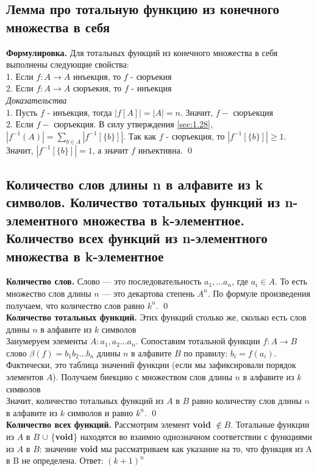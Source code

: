 \documentclass[a4paper]{article}
\begin{document}
\subsection{Лемма про тотальную функцию из конечного множества в себя}
\textbf{Формулировка.} Для тотальных функций из конечного множества в себя выполнены следующие свойства:\\[2mm]
 1. Если $f: A\rightarrow A$ инъекция, то $f$ - сюръекия\\[2mm]
 2. Если $f: A\rightarrow A$ сюръекия, то $f$ - инъекция\\[2mm]
\textit{Доказательства}\\[2mm]
 1. Пусть $f$ - инъекция, тогда $|f[A]|=|A|=n$. Значит, $f-$ сюръекция\\[2mm]
 2. Если $f-$ сюръекция. В силу утверждения \ref{sec:1.28}, $|f^{-1}(A)|=\sum\limits_{b\in A} |f^{-1}[\{b\}]|.$ Так как $f$ - сюръекция, то $|f^{-1}[\{b\}]|\geqslant1$. Значит, $|f^{-1}[\{b\}]|=1$, а значит $f$ инъективна. \qed
\subsection{Количество слов длины n в алфавите из k символов. Количество тотальных функций из n-элементного множества в k-элементное. Количество всех функций из n-элементного множества в k-элементное}
\textbf{Количество слов.} Слово — это последовательность $a_1,\ldots a_n$, где $a_i\in A$. То есть множество слов длины $n$ — это декартова степень $A^n$. По формуле произведения получаем, что количество слов равно $k^n$. \qed\\[2mm]
\textbf{Количество тотальных функций.} Этих функций столько же, сколько есть слов длины $n$ в алфавите из $k$ символов\\[2mm]
 Занумеруем элементы $A: a_1,a_2\ldots a_n$. Сопоставим тотальной функции $f: A\rightarrow B$ слово $\beta(f)=b_1b_2\ldots b_n$ длины $n$ в алфавите $B$ по правилу: $b_i=f(a_i)$. Фактически, это таблица значений функции (если мы зафиксировали порядок элементов $A$). Получаем биекцию с множеством слов длины $n$ в алфавите из $k$ символов\\[2mm]
 Значит, количество тотальных функций из $A$ в $B$ равно количеству слов длины $n$ в алфавите из $k$ символов и равно $k^n$. \qed\\[2mm]
\textbf{Количество всех функций.} Рассмотрим элемент \textbf{void} $\notin B$. Тотальные функции из $A$ в $B$ $\cup$ \{\textbf{void}\} находятся во взаимно однозначном соответствии с функциями из $A$ в $B$: значение \textbf{void} мы рассматриваем как указание на то, что функция из A в B не определена. Ответ: $(k+1)^n$
\end{document}
